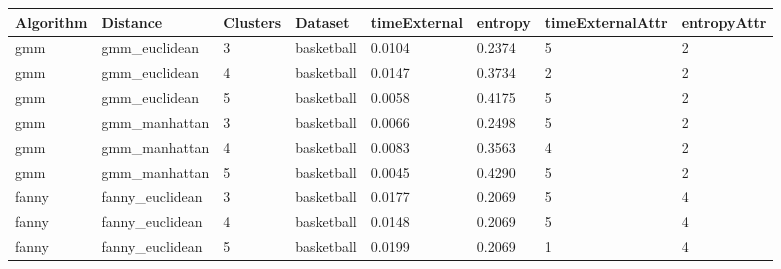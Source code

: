 \documentclass[
]{article}
\begin{document}
\newpage
\begin{table}[h!]
\centering
\begin{tabular}{| p{1.3cm} | p{2.1cm} | p{0.9cm} | p{1.1cm} | p{1.6cm} | p{0.8cm} | p{2.1cm} | p{1.5cm} |}
\hline
\scriptsize Algorithm  & \scriptsize     Distance    &  \scriptsize Clusters &  \scriptsize  Dataset   & \scriptsize timeExternal  & \scriptsize entropy   & \scriptsize timeExternalAttr & \scriptsize entropyAttr \\
\hline
\scriptsize   gmm      & \scriptsize   gmm\_euclidean & \scriptsize     3     & \scriptsize basketball  & \scriptsize     0.0104    & \scriptsize 0.2374 &  \scriptsize        5        & \scriptsize      2 \\
\scriptsize   gmm      & \scriptsize   gmm\_euclidean & \scriptsize     4     & \scriptsize basketball  & \scriptsize     0.0147    & \scriptsize 0.3734 &  \scriptsize        2        & \scriptsize      2\\
\scriptsize   gmm      & \scriptsize   gmm\_euclidean & \scriptsize     5     & \scriptsize basketball  & \scriptsize     0.0058    & \scriptsize 0.4175 &  \scriptsize        5        & \scriptsize      2 \\
\cline{2-8}
\scriptsize   gmm      & \scriptsize   gmm\_manhattan & \scriptsize     3     & \scriptsize basketball  & \scriptsize     0.0066    & \scriptsize 0.2498 &  \scriptsize        5        & \scriptsize      2 \\
\scriptsize   gmm      & \scriptsize   gmm\_manhattan & \scriptsize     4     & \scriptsize basketball  & \scriptsize     0.0083    & \scriptsize 0.3563 &  \scriptsize        4        & \scriptsize      2 \\
\scriptsize   gmm      & \scriptsize   gmm\_manhattan & \scriptsize     5     & \scriptsize basketball  & \scriptsize     0.0045    & \scriptsize 0.4290 &  \scriptsize        5        & \scriptsize      2 \\
\hline
\scriptsize fanny      & \scriptsize fanny\_euclidean & \scriptsize     3     & \scriptsize basketball  & \scriptsize     0.0177    & \scriptsize 0.2069 &  \scriptsize        5        & \scriptsize      4 \\
\scriptsize fanny      & \scriptsize fanny\_euclidean & \scriptsize     4     & \scriptsize basketball  & \scriptsize     0.0148    & \scriptsize 0.2069 &  \scriptsize        5        & \scriptsize      4 \\
\scriptsize fanny      & \scriptsize fanny\_euclidean & \scriptsize     5     & \scriptsize basketball  & \scriptsize     0.0199    & \scriptsize 0.2069 &  \scriptsize        1        & \scriptsize      4 \\

\end{tabular}
\end{table}
\end{document}
